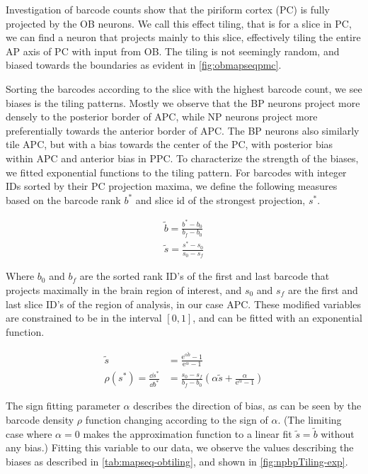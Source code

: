 \documentclass[../dissertation.tex]{subfiles}
\begin{document}
Investigation of barcode counts show that the piriform cortex (PC) is fully projected by the OB neurons.
We call this effect tiling, that is for a slice in PC, we can find a neuron that projects mainly to this slice, effectively tiling the entire AP axis of PC with input from OB.
The tiling is not seemingly random, and biased towards the boundaries as evident in \cref{fig:obmapseqpmc}.

Sorting the barcodes according to the slice with the highest barcode count, we see biases is the tiling patterns.
Mostly we observe that the BP neurons project more densely to the posterior border of APC, while NP neurons project more preferentially towards the anterior border of APC.
The BP neurons also similarly tile APC, but with a bias towards the center of the PC, with posterior bias within APC and anterior bias in PPC.
To characterize the strength of the biases, we fitted exponential functions to the tiling pattern.
For barcodes with integer IDs sorted by their PC projection maxima, we define the following measures based on the barcode rank $b^*$ and slice id of the strongest projection, $s^*$.

\begin{align}
    \tilde{b} = \frac{b^* - b_0}{b_f - b_0} \\
    \tilde{s} = \frac{s^* - s_0}{s_0 - s_f}
\end{align}

Where $b_0$ and $b_f$ are the sorted rank ID's of the first and last barcode that projects maximally in the brain region of interest,
and $s_0$ and $s_f$ are the first and last slice ID's of the region of analysis, in our case APC.
These modified variables are constrained to be in the interval $[0,1]$, and can be fitted with an exponential function.

\begin{align}
    \label{eqn:expFits}
    \tilde{s} & =
        \frac{\mathrm{e}^{\alpha \tilde{b}} - 1}{\mathrm{e}^{\alpha} - 1} \\
    \rho \left( s^* \right) =
    \frac{\dd{s^*}}{\dd{b^*}} & =
        \frac{s_0 - s_f}{b_f - b_0} \left( \alpha \tilde{s} + \frac{\alpha}{\mathrm{e}^{\alpha} - 1} \right)
\end{align}

The sign fitting parameter $\alpha$ describes the direction of bias, as can be seen by the barcode density $\rho$ function changing according to the sign of $\alpha$.
(The limiting case where $\alpha = 0$ makes the approximation function to a linear fit $\tilde{s} = \tilde{b}$ without any bias.)
Fitting this variable to our data, we observe the values describing the biases as described in \cref{tab:mapseq-obtiling}, and shown in \cref{fig:npbpTiling-exp}.
\end{document}
